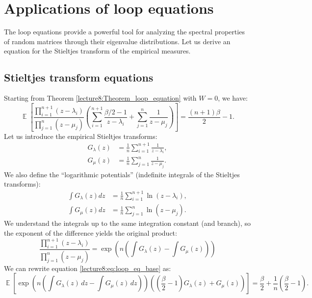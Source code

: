 \documentclass[letterpaper,11pt,oneside,reqno]{book}
\numberwithin{equation}{chapter}  %
\theoremstyle{definition}
\begin{document}
\section{Applications of loop equations}

The loop equations provide a powerful tool for analyzing the spectral properties of random matrices through their eigenvalue distributions. Let us derive an equation for the Stieltjes transform of the empirical measures.

\subsection{Stieltjes transform equations}
Starting from Theorem \ref{lecture8:Theorem_loop_equation} with $W=0$, we have:
\begin{equation} \label{lecture8:eq:loop_eq_base}
	\operatorname{\mathbb{E}}\left[\frac{\prod_{i=1}^{n+1}(z-\lambda_i)}{\prod_{j=1}^n(z-\mu_j)}\left(\sum_{i=1}^{n+1}\frac{\beta/2-1}{z-\lambda_i} + \sum_{j=1}^n\frac{1}{z-\mu_j}\right)\right] = \frac{(n+1)\beta}{2}-1.
\end{equation}
Let us introduce the empirical Stieltjes transforms:
\begin{align*}
G_\lambda(z) &= \frac{1}{n}\sum_{i=1}^{n+1}\frac{1}{z-\lambda_i}, \\
G_\mu(z) &= \frac{1}{n}\sum_{j=1}^n\frac{1}{z-\mu_j}.
\end{align*}
We also define the ``logarithmic potentials'' (indefinite integrals of the Stieltjes transforms):
\begin{align*}
\int G_\lambda(z)dz &= \frac{1}{n}\sum_{i=1}^{n+1}\ln(z-\lambda_i), \\
\int G_\mu(z)dz &= \frac{1}{n}\sum_{j=1}^n\ln(z-\mu_j).
\end{align*}
We understand the integrals up to the same integration constant (and branch), so the exponent of the difference
yields the original product:
\begin{equation*}
	\frac{\prod_{i=1}^{n+1}(z-\lambda_i)}{\prod_{j=1}^n(z-\mu_j)} = \exp\left(n\left(\int G_\lambda(z) - \int G_\mu(z)\right)\right)
\end{equation*}
We can rewrite equation \eqref{lecture8:eq:loop_eq_base} as:
\begin{equation} \label{lecture8:eq:stieltjes_transform_eq}
	\operatorname{\mathbb{E}}\left[\exp\left(n\left(\int G_\lambda(z)\,dz - \int G_\mu(z)\,dz\right)\right)\left(\left(\frac{\beta}{2}-1\right)G_\lambda(z) + G_\mu(z)\right)\right] = \frac{\beta}{2} + \frac{1}{n}\left(\frac{\beta}{2}-1\right).
\end{equation}
\end{document}
